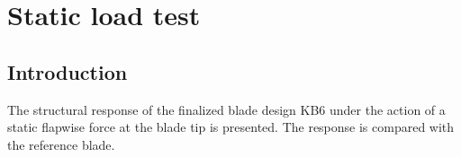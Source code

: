 \chapter{Static load test}
\label{ch:load_test}

\section{Introduction}
\label{sec:static_intro}
The structural response of the finalized blade design KB6 under the action of a static flapwise force at the blade tip is presented. The response is compared with the reference blade.  